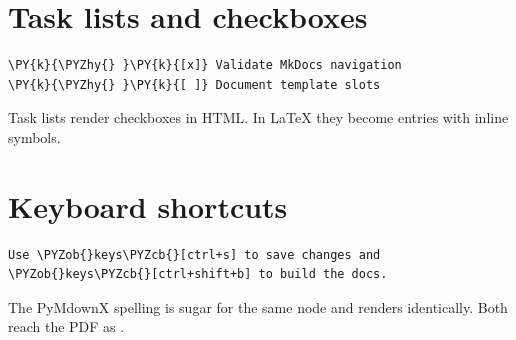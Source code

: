 \documentclass[a4paper,twoside]{article}
\begin{document}
\section{Task lists and checkboxes}
\begin{tscode}[lang=md, engine=pygments]
\begin{Verbatim}[commandchars=\\\{\},breaklines, breakanywhere, commandchars=\\\{\}]
\PY{k}{\PYZhy{} }\PY{k}{[x]} Validate MkDocs navigation
\PY{k}{\PYZhy{} }\PY{k}{[ ]} Document template slots
\end{Verbatim}
\end{tscode}
Task lists render checkboxes in HTML. In \LaTeX{} they become  entries
with inline symbols.
\section{Keyboard shortcuts}
\begin{tscode}[lang=md, engine=pygments]
\begin{Verbatim}[commandchars=\\\{\},breaklines, breakanywhere, commandchars=\\\{\}]
Use \PYZob{}keys\PYZcb{}[ctrl+s] to save changes and \PYZob{}keys\PYZcb{}[ctrl+shift+b] to build the docs.
\end{Verbatim}
\end{tscode}
The PyMdownX spelling  is sugar for the same node and renders
identically. Both reach the PDF as .
\end{document}
